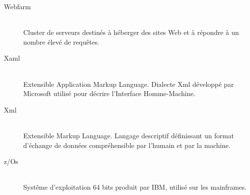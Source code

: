\documentclass[a4paper,french,12pt]{article}
\begin{document}
\begin{description}
			\item[Webfarm] \hfill \\
				Cluster de serveurs destinés à héberger des sites Web et à répondre à un nombre élevé de requêtes.
			\item[Xaml] \hfill \\
				Extensible Application Markup Language. Dialecte Xml développé par Microsoft utilisé pour décrire l'Interface Homme-Machine.
			\item[Xml] \hfill \\
				Extensible Markup Language. Langage descriptif définissant un format d'échange de données compréhensible par l'humain et par la machine.
			\item[z/Os] \hfill \\
				Systême d'exploitation 64 bits produit par IBM, utilisé sur les mainframes.
			\end{description}
		
\end{document}
